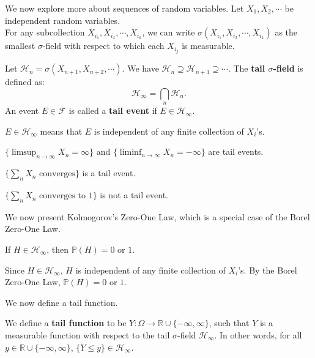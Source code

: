\documentclass{huhtakm-template-book-v2}
\newcommand{\prob}{\mathbb{P}}
\begin{document}
    We now explore more about sequences of random variables. Let $X_{1},X_{2},\cdots$ be independent random variables.\\
    For any subcollection $X_{i_{1}},X_{i_{2}},\cdots,X_{i_{k}}$, we can write $\sigma(X_{i_{1}},X_{i_{2}},\cdots,X_{i_{k}})$ as the smallest $\sigma$-field with respect to which each $X_{i_{j}}$ is measurable.
    \begin{defn}
        Let $\mathcal{H}_{n} = \sigma(X_{n+1},X_{n+2},\cdots)$. We have $\mathcal{H}_{n}\supseteq\mathcal{H}_{n+1}\supseteq\cdots$. The \textbf{tail $\sigma$-field} is defined as:
        \begin{equation*}
            \mathcal{H}_{\infty} = \bigcap_{n}\mathcal{H}_{n}.
        \end{equation*}
        An event $E \in \mathcal{F}$ is called a \textbf{tail event} if $E \in \mathcal{H}_{\infty}$.
    \end{defn}
    \begin{rem}
        $E \in \mathcal{H}_{\infty}$ means that $E$ is independent of any finite collection of $X_{i}$'s.
    \end{rem}
    \begin{eg}
        $\{\limsup_{n \to \infty}X_{n} = \infty\}$ and $\{\liminf_{n \to \infty}X_{n} = -\infty\}$ are tail events.
    \end{eg}
    \begin{eg}
        $\{\sum_{n}X_{n}\text{ converges}\}$ is a tail event.
    \end{eg}
    \begin{eg}
        $\{\sum_{n}X_{n}\text{ converges to }1\}$ is not a tail event.
    \end{eg}
    We now present Kolmogorov's Zero-One Law, which is a special case of the Borel Zero-One Law.
    \begin{thm}
        If $H \in \mathcal{H}_{\infty}$, then $\prob(H) = 0$ or $1$.
    \end{thm}
    \begin{proofing}
        Since $H \in \mathcal{H}_{\infty}$, $H$ is independent of any finite collection of $X_{i}$'s. By the Borel Zero-One Law, $\prob(H) = 0$ or $1$.
    \end{proofing}
    We now define a tail function.
    \begin{defn}
        We define a \textbf{tail function} to be $Y:\Omega \to \mathbb{R}\cup\{-\infty,\infty\}$, such that $Y$ is a measurable function with respect to the tail $\sigma$-field $\mathcal{H}_{\infty}$. In other words, for all $y \in \mathbb{R}\cup\{-\infty,\infty\}$, $\{Y \leq y\} \in \mathcal{H}_{\infty}$.
    \end{defn}
\end{document}
